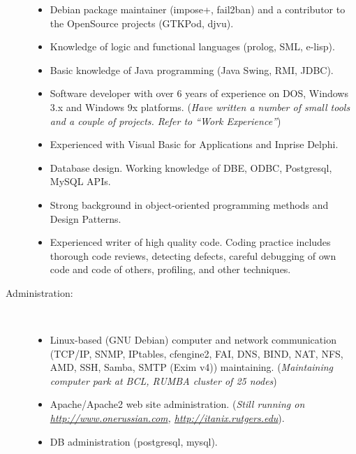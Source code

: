 \documentclass[10pt,overlapped,line]{res}
\newcommand{\wdescription}[1]{({\small \textit{#1}})}
\begin{document}
\begin{resume}
\begin{description}
\begin{itemize}
      \item Debian package maintainer (impose+, fail2ban) and a
        contributor to the {O}pen{S}ource projects (GTKPod, djvu).

      \item Knowledge of logic and functional languages (prolog, SML, e-lisp).

      \item Basic knowledge of Java programming (Java Swing, RMI,
        JDBC).

      \item Software developer with over 6 years of experience on DOS,
        Windows 3.x and Windows 9x platforms.
        \wdescription{Have written a number of small tools and a couple of
          projects. Refer to ``Work Experience''}

      \item Experienced with Visual Basic for Applications and Inprise
        Delphi.

      \item Database design. Working knowledge of DBE, ODBC,
        Postgresql, MySQL APIs.

      \item Strong background in object-oriented programming methods
        and Design Patterns.

      \item Experienced writer of high quality code. Coding practice
        includes thorough code reviews, detecting defects, careful
        debugging of own code and code of others, profiling, and other
        techniques.
      \end{itemize}

    \item[Administration:] \hspace*{\fill} \\
      \begin{itemize}
      \item Linux-based (GNU Debian) computer and network
        communication (TCP/IP, SNMP, IPtables, cfengine2, FAI, DNS,
        BIND, NAT, NFS, AMD, SSH, Samba, SMTP (Exim v4)) maintaining.
        \wdescription{Maintaining computer park at {BCL}, {RUMBA}
          cluster of 25 nodes}
      \item Apache/Apache2 web site administration.
        \wdescription{Still running on
          \href{URL}{http://www.onerussian.com}, \href{URL}{http://itanix.rutgers.edu}}.
      \item DB administration (postgresql, mysql).
      \end{itemize}


\end{description}
\end{resume}
\end{document}
